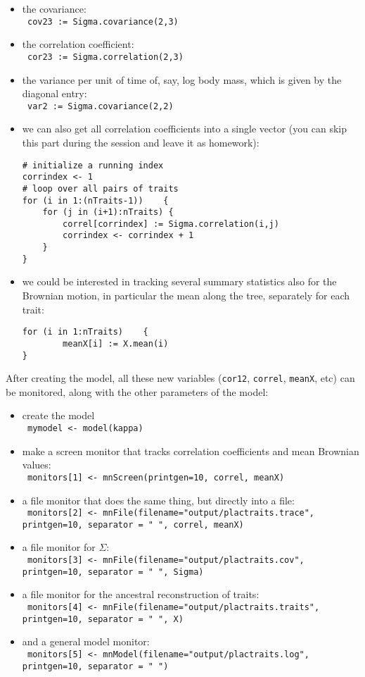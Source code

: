 \documentclass[usletter]{article}
\newcommand{\cmd}[1]{\texttt{#1}}
\begin{document}
\begin{itemize}
\item
the covariance:
\\
\cmd{
cov23 := Sigma.covariance(2,3)
}
\item
the correlation coefficient:
\\
\cmd{
cor23 := Sigma.correlation(2,3)
}
\item
the variance per unit of time of, say, log body mass, which is given by the diagonal entry:
\\
\cmd{
var2 := Sigma.covariance(2,2)
}
\item
we can also get all correlation coefficients into a single vector (you can skip this part during the session and leave it as  homework):
\begin{verbatim}
# initialize a running index
corrindex <- 1
# loop over all pairs of traits
for (i in 1:(nTraits-1))    {
    for (j in (i+1):nTraits) {
        correl[corrindex] := Sigma.correlation(i,j)
        corrindex <- corrindex + 1
    }
}
\end{verbatim}
\item
we could be interested in tracking several summary statistics also for the Brownian motion, in particular the mean along the tree, separately for each trait:
\begin{verbatim}
for (i in 1:nTraits)    {
        meanX[i] := X.mean(i)
}
\end{verbatim}
\end{itemize}
After creating the model, all these new variables (\cmd{cor12}, \cmd{correl}, \cmd{meanX}, etc) can be monitored, along with the other parameters of the model:
\begin{itemize}
\item
create the model
\\
\cmd{
mymodel <- model(kappa)
}
\item
make a screen monitor that tracks correlation coefficients and mean Brownian values:
\\
\cmd{
monitors[1] <- mnScreen(printgen=10, correl, meanX)
}
\item
a file monitor that does the same thing, but directly into a file:
\\
\cmd{
monitors[2] <- mnFile(filename="output/plactraits.trace", printgen=10, separator = "       ", correl, meanX)
}
\item
a file monitor for $\Sigma$:
\\
\cmd{
monitors[3] <- mnFile(filename="output/plactraits.cov", printgen=10, separator = "  ", Sigma)
}
\item
a file monitor for the ancestral reconstruction of traits:
\\
\cmd{
monitors[4] <- mnFile(filename="output/plactraits.traits", printgen=10, separator = "       ", X)
}
\item
and a general model monitor:
\\
\cmd{
monitors[5] <- mnModel(filename="output/plactraits.log", printgen=10, separator = " ")
}
\end{itemize}
\end{document}
